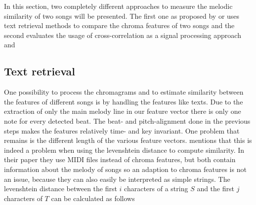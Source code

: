 In this section, two completely different approaches to measure the melodic similarity of two songs will be presented. The first one as proposed by \cite{chroma1} or \cite{chroma4} uses text retrieval methods to compare the chroma features of two songs and the second evaluates the usage of cross-correlation as a signal processing approach \cite{chroma2} and \cite{chroma3}

\subsection{Text retrieval}

One possibility to process the chromagrams and to estimate similarity between the features of different songs is by handling the features like texts. Due to the extraction of only the main melody line in our feature vector there is only one note for every detected beat. The beat- and pitch-alignment done in the previous steps makes the features relatively time- and key invariant. One problem that remains is the different length of the various feature vectors. \cite{chroma4} mentions that this is indeed a problem when using the levenshtein distance to compute similarity. In their paper they use MIDI files instead of chroma features, but both contain information about the melody of songs so an adaption to chroma features is not an issue, because they can also easily be interpreted as simple strings. The levenshtein distance between the first $i$ characters of a string $S$ and the first $j$ characters of $T$ can be calculated as follows \cite[p. 7]{chroma4}

